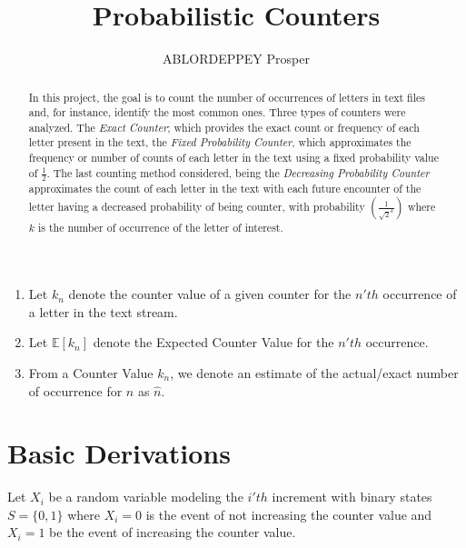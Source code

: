 \documentclass[longpaper, english, final, times]{revdetua}
\begin{document}
	
	
	\title{Probabilistic Counters}
	\author{ABLORDEPPEY Prosper} %
	\maketitle
	
	\begin{abstract}%
		In this project, the goal is to count the number of occurrences of letters in text files and, for instance, identify the most common ones. Three types of counters were analyzed. The \textit{Exact Counter}; which provides the exact count or frequency of each letter present in the text, the \textit{Fixed Probability Counter}, which approximates the frequency or number of counts of each letter in the text using a fixed probability value of $\frac{1}{2}$. The last counting method considered, being the \textit{Decreasing Probability Counter} approximates the count of each letter in the text with each future encounter of the letter having a decreased probability of being counter, with probability $\left(\frac{1}{\sqrt{2}^k}\right)$ where $k$ is the number of occurrence of the letter of interest.
	\end{abstract}
	
	
	\begin{keywords}%
		\begin{enumerate}
			\item Let $k_n$ denote the counter value of a given counter for the $n'th$ occurrence of a letter in the text stream.
			\item Let $\mathbb{E}[k_n]$ denote the Expected Counter Value for the $n'th$ occurrence.
			\item From a Counter Value $k_n$, we denote an estimate of the actual/exact number of occurrence for $n$ as $\hat{n}$.
		\end{enumerate}
	\end{keywords}
	

	\section{Basic Derivations}
		Let $X_i$ be a random variable modeling the $i'th$ increment with binary states $S=\{0,1\}$ where $X_i=0$ is the event of not increasing the counter value and $X_i=1$ be the event of increasing the counter value.\\
		 
\end{document}
